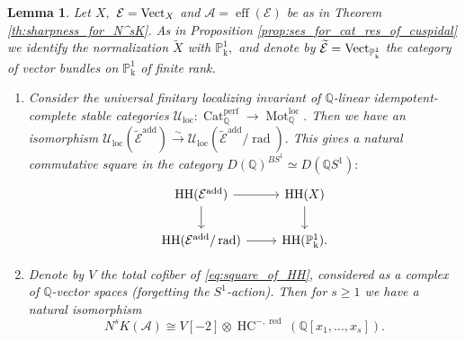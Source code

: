 \documentclass[11pt,leqno]{amsart}
\newtheorem{lemma}[theo]{Lemma}
\numberwithin{equation}{section}
\def\Q{\mathbb{Q}}
\def\wt{\widetilde}
\def\PP{{\mathbb P}}
\def\rad{\operatorname{rad}}
\newcommand{\xto}{\xrightarrow}
\newcommand{\Mot}{\operatorname{Mot}}
\newcommand{\Cat}{\operatorname{Cat}}
\newcommand{\loc}{\operatorname{loc}}
\newcommand{\red}{\operatorname{red}}
\newcommand{\eff}{\operatorname{eff}}
\newcommand{\mk}{\mathrm k}
\newcommand{\cA}{{\mathcal A}}
\newcommand{\cE}{{\mathcal E}}
\newcommand{\cU}{{\mathcal U}}
\newcommand{\HH}{\operatorname{HH}}
\newcommand{\HC}{\operatorname{HC}}
\newcommand{\perf}{\operatorname{perf}}
\newcommand{\add}{\operatorname{add}}
\newcommand{\Vect}{{\rm Vect}}
\begin{document}
\begin{lemma}\label{lem:computing_N^sK_of_effaceable}
Let $X,$ $\cE=\Vect_X$ and $\cA=\eff(\cE)$ be as in Theorem \ref{th:sharpness_for_N^sK}. As in Proposition \ref{prop:ses_for_cat_res_of_cuspidal} we identify the normalization $\wt{X}$ with $\PP^1_{\mk},$ and denote by $\wt{\cE}=\Vect_{\PP^1_{\mk}}$ the category of vector bundles on $\PP^1_{\mk}$ of finite rank.
\begin{enumerate}[label=(\roman*),ref=(\roman*)]
	\item Consider the universal finitary localizing invariant of $\Q$-linear idempotent-complete stable categories $\cU_{\loc}:\Cat_{\Q}^{\perf}\to \Mot^{\loc}_{\Q}.$ Then we have an isomorphism $\cU_{\loc}(\wt{\cE}^{\add})\xto{\sim}\cU_{\loc}(\wt{\cE}^{\add}/\rad).$ This gives a natural commutative square in the category $D(\Q)^{B S^1}\simeq D(\Q S^1):$
	\begin{equation}\label{eq:square_of_HH}
		\begin{tikzcd}
			\HH(\cE^{\add})\ar[r]\ar[d] & \HH(X)\ar[d]\\
			\HH(\cE^{\add}/\rad) \ar[r] & \HH(\PP^1_{\mk}).
		\end{tikzcd}
	\end{equation}
	\label{square_of_HH}
\item Denote by $V$ the total cofiber of \eqref{eq:square_of_HH}, considered as a complex of $\Q$-vector spaces (forgetting the $S^1$-action). Then for $s\geq 1$ we have a natural isomorphism
\begin{equation}\label{eq:N^sK_of_A}
N^s K(\cA)\cong V[-2]\otimes \HC^{-,\red}(\Q[x_1,\dots,x_s]).
\end{equation}
\label{higher_nik_K_theory_via_nil_HC^-}
\end{enumerate}
\end{lemma}

\end{document}
